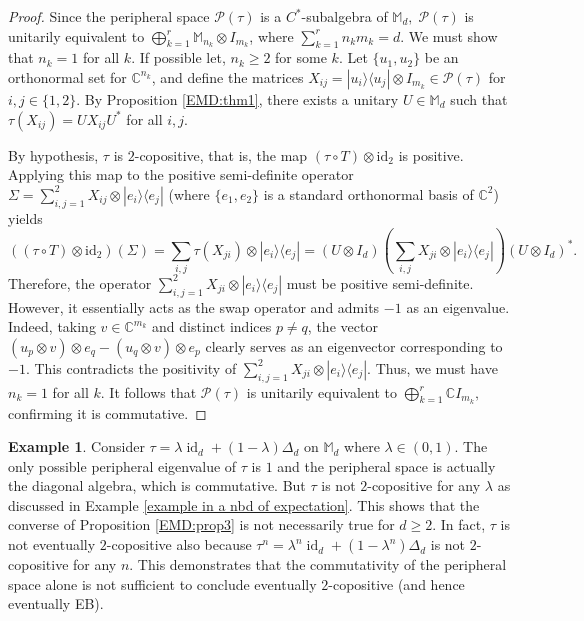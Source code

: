 \documentclass[11pt,reqno]{amsart}
\theoremstyle{definition}
\newtheorem{eg}[defn]{Example}
\theoremstyle{plain}
\theoremstyle{remark}
\newcommand{\la}{\langle}
\newcommand{\ra}{\rangle}
\numberwithin{equation}{section}%
\begin{document}
\begin{proof}
	Since the peripheral space $\mathcal{P}(\tau)$ is a $C^*$-subalgebra of $\mathbb{M}_d, \;\mathcal{P}(\tau)$ is unitarily equivalent to $\bigoplus_{k=1}^r \mathbb{M}_{n_k} \otimes I_{m_k}$, where $\sum_{k=1}^r n_k m_k = d$. We must show that $n_k = 1$ for all $k$. If possible let, $n_k \geq 2$ for some $k$. Let $\{u_1,u_2\}$ be an orthonormal set for $\mathbb{C}^{n_k}$, and define the matrices $X_{ij} = |u_i\rangle\langle u_j| \otimes I_{m_k} \in \mathcal{P}(\tau)$ for $i,j\in\{1,2\}$. By Proposition \ref{EMD:thm1}, there exists a unitary $U \in \mathbb{M}_d$ such that $\tau(X_{ij}) = U X_{ij} U^*$ for all $i, j$.
	
	By hypothesis, $\tau$ is $2$-copositive, that is, the map $(\tau \circ T) \otimes \text{id}_{2}$ is positive. Applying this map to the positive semi-definite operator $\Sigma = \sum_{i,j=1}^2 X_{ij} \otimes |e_i\ra\la e_j|$ (where $\{e_1,e_2\}$ is a standard orthonormal basis of $\mathbb{C}^2$) yields
	\[
	((\tau \circ T) \otimes \text{id}_{2})(\Sigma) = \sum_{i,j} \tau(X_{ji}) \otimes |e_i\ra\la e_j| = (U \otimes I_d) \left( \sum_{i,j} X_{ji} \otimes |e_i\ra\la e_j| \right) (U \otimes I_d)^*.
	\]
	Therefore, the operator $\sum_{i,j=1}^2 X_{ji} \otimes |e_i\ra\la e_j|$ must be positive semi-definite. However, it essentially acts as the swap operator and admits $-1$ as an eigenvalue. Indeed, taking $v \in \mathbb{C}^{m_k}$ and distinct indices $p \neq q$, the vector $ (u_p \otimes v) \otimes e_q - (u_q \otimes v) \otimes e_p $ clearly serves as an eigenvector corresponding to $-1$. This contradicts the positivity of $\sum_{i,j=1}^2 X_{ji} \otimes |e_i\ra\la e_j|$. Thus, we must have $n_k = 1$ for all $k$. It follows that $\mathcal{P}(\tau)$ is unitarily equivalent to $\bigoplus_{k=1}^r \mathbb{C} I_{m_k},$ confirming it is commutative.
\end{proof}

\begin{eg}\label{commutative peripheral space but not EB}
	 Consider $\tau=\lambda\operatorname{id}_d+(1-\lambda)\Delta_d$ on $\mathbb{M}_d$ where $\lambda\in(0,1)$. The only possible peripheral eigenvalue of $\tau$ is $1$ and the peripheral space is actually the diagonal algebra, which is commutative. But $\tau$ is not $2$-copositive for any $\lambda$ as discussed in Example \ref{example in a nbd of expectation}. This shows that the converse of Proposition \ref{EMD:prop3} is not necessarily true for $d\ge 2$. In fact, $\tau$ is not eventually $2$-copositive also because $\tau^n=\lambda^n \operatorname{id}_d+(1-\lambda^n)\Delta_d$ is not $2$-copositive for any $n$. This demonstrates that the commutativity of the peripheral space alone is not sufficient to conclude eventually $2$-copositive (and hence eventually EB).
\end{eg}
\end{document}

